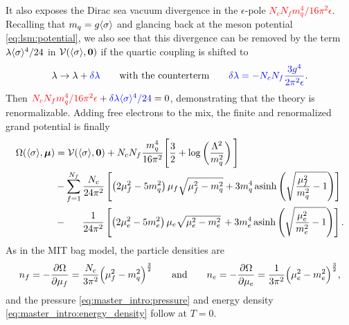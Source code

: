It also exposes the Dirac sea vacuum divergence in the $\epsilon$-pole \textcolor{red}{$N_c N_f m_q^4 / 16 \pi^2 \epsilon$}.
Recalling that $m_q=g \langle \sigma \rangle$ and glancing back at the meson potential \eqref{eq:lsm:potential},
we also see that this divergence can be removed by the term \textcolor{blue}{$\lambda \langle \sigma \rangle^4 / 24$} in $\mathcal{V}(\langle \sigma \rangle,{\bm{0}})$
if the quartic coupling is shifted to
\begin{equation}
	\lambda \rightarrow \lambda + \textcolor{blue}{\delta\lambda}
	\qquad \text{with the counterterm} \qquad
	\textcolor{blue}{\delta\lambda = -N_c N_f \frac{3 g^4}{2 \pi^2 \epsilon}} .
\end{equation}
Then $\textcolor{red}{N_c N_f m_q^4 / 16 \pi^2 \epsilon} + \textcolor{blue}{\delta\lambda \langle \sigma \rangle^4 / 24} = 0$,
demonstrating that the theory is renormalizable.
Adding free electrons to the mix, the finite and renormalized grand potential is finally
\begin{equation}
\begin{split}
	\Omega(\langle \sigma \rangle,{\bm{\mu}}) &= \mathcal{V}(\langle \sigma \rangle,{\bm{0}}) + N_c N_f \frac{m_q^4}{16 \pi^2} \Bigg[ \frac{3}{2} + \log\left(\frac{{\Lambda}^2}{m_q^2}\right) \Bigg] \\
	                               &-\sum_{f=1}^{\smash{N_f}} \frac{N_c}{24 \pi^2} \left[ \left( 2 \mu_f^2 - 5 m_q^2 \right) \mu_f \sqrt{\mu_f^2 - m_q^2} + 3 m_q^4 \operatorname{asinh} \left( \sqrt{\frac{\mu_{\smash{f}}^2}{m_q^2}-1} \right) \right] \\
	                               &-\phantom{\sum} \, \frac{1}{24 \pi^2} \left[ \left( 2 \mu_e^2 - 5 m_e^2 \right) \mu_e \sqrt{\mu_e^2 - m_e^2} \, + 3 m_e^4 \operatorname{asinh} \left( \sqrt{\frac{\mu_{\smash{e}}^2}{m_e^2}-1} \right) \right].
\end{split}
\label{eq:lsm:grand_potential}
\end{equation}
As in the MIT bag model,
the particle densities are
\begin{equation}
	n_f = -\pdv{\Omega}{\mu_f} = \frac{N_c}{3 \pi^2} \Big( \mu_f^2 - m_q^2 \Big)^{\frac32}
	\qquad \text{and} \qquad
	n_e = -\pdv{\Omega}{\mu_e} = \frac{  1}{3 \pi^2} \Big( \mu_e^2 - m_e^2 \Big)^{\frac32},
\label{eq:lsm:particle_densities}%
\end{equation}%
and the pressure \eqref{eq:master_intro:pressure} and energy density \eqref{eq:master_intro:energy_density} follow at $T=0$.

